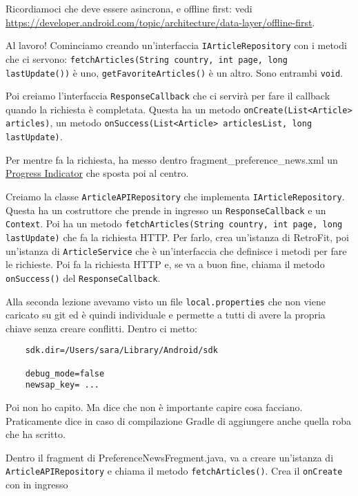 \par Ricordiamoci che deve essere asincrona, e offline first: vedi \url{https://developer.android.com/topic/architecture/data-layer/offline-first}.
\par Al lavoro! Cominciamo creando un'interfaccia \texttt{IArticleRepository} con i metodi che ci servono: \texttt{fetchArticles(String country, int page, long lastUpdate())} è uno, \texttt{getFavoriteArticles()} è un altro. Sono entrambi \texttt{void}.
\par Poi creiamo l'interfaccia \texttt{ResponseCallback} che ci servirà per fare il callback quando la richiesta è completata. Questa ha un metodo \texttt{onCreate(List<Article> articles)}, un metodo \texttt{onSuccess(List<Article> articlesList, long lastUpdate)}.
\par Per mentre fa la richiesta, ha messo dentro fragment\_preference\_news.xml un \href{https://m3.material.io/components/progress-indicators/overview}{Progress Indicator} che sposta poi al centro.
\par Creiamo la classe \texttt{ArticleAPIRepository} che implementa \texttt{IArticleRepository}. Questa ha un costruttore che prende in ingresso un \texttt{ResponseCallback} e un \texttt{Context}. Poi ha un metodo \texttt{fetchArticles(String country, int page, long lastUpdate)} che fa la richiesta HTTP. Per farlo, crea un'istanza di RetroFit, poi un'istanza di \texttt{ArticleService} che è un'interfaccia che definisce i metodi per fare le richieste. Poi fa la richiesta HTTP e, se va a buon fine, chiama il metodo \texttt{onSuccess()} del \texttt{ResponseCallback}.
\par Alla seconda lezione avevamo visto un file \texttt{local.properties} che non viene caricato su git ed è quindi individuale e permette a tutti di avere la propria chiave senza creare conflitti. Dentro ci metto:
\begin{verbatim}
    sdk.dir=/Users/sara/Library/Android/sdk

    debug_mode=false
    newsap_key= ...
\end{verbatim}
Poi non ho capito. Ma dice che non è importante capire cosa facciano. Praticamente dice in caso di compilazione Gradle di aggiungere anche quella roba che ha scritto.
\par Dentro il fragment di PreferenceNewsFregment.java, va a creare un'istanza di \texttt{ArticleAPIRepository} e chiama il metodo \texttt{fetchArticles()}. Crea il \texttt{onCreate} con in ingresso 

